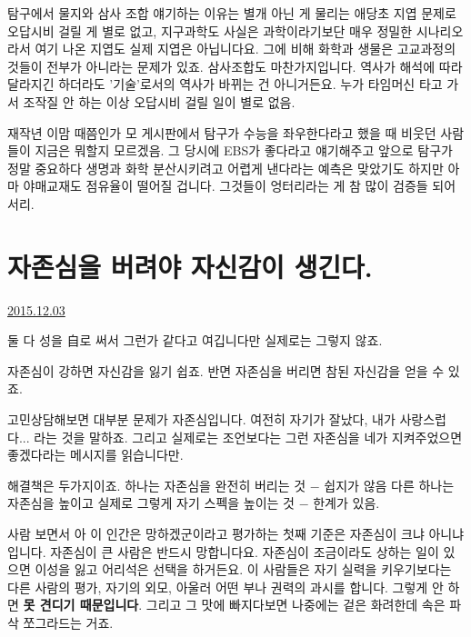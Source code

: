 탐구에서 물지와 삼사 조합 얘기하는 이유는 별개 아닌 게
물리는 애당초 지엽 문제로 오답시비 걸릴 게 별로 없고,
지구과학도 사실은 과학이라기보단 매우 정밀한 시나리오라서 여기 나온 지엽도 실제 지엽은 아닙니다요.
그에 비해 화학과 생물은 고교과정의 것들이 전부가 아니라는 문제가 있죠.
삼사조합도 마찬가지입니다. 역사가 해석에 따라 달라지긴 하더라도 '기술'로서의 역사가 바뀌는 건 아니거든요.
누가 타임머신 타고 가서 조작질 안 하는 이상 오답시비 걸릴 일이 별로 없음.
\vspace{5mm}

재작년 이맘 때쯤인가 모 게시판에서 탐구가 수능을 좌우한다라고 했을 때 비웃던 사람들이 지금은 뭐할지 모르겠음.
그 당시에 EBS가 좋다라고 얘기해주고 앞으로 탐구가 정말 중요하다 생명과 화학 분산시키려고 어렵게 낸다라는 예측은 맞았기도 하지만
아마 야매교재도 점유율이 떨어질 겁니다. 그것들이 엉터리라는 게 참 많이 검증들 되어서리.
\vspace{5mm}







\section{자존심을 버려야 자신감이 생긴다.}
\href{https://www.kockoc.com/Apoc/524793}{2015.12.03}

\vspace{5mm}

둘 다 성을 自로 써서 그런가 같다고 여깁니다만 실제로는 그렇지 않죠.
\vspace{5mm}

자존심이 강하면 자신감을 잃기 쉽죠.
반면 자존심을 버리면 참된 자신감을 얻을 수 있죠.
\vspace{5mm}

고민상담해보면 대부분 문제가 자존심입니다.
여전히 자기가 잘났다, 내가 사랑스럽다... 라는 것을 말하죠.
그리고 실제로는 조언보다는 그런 자존심을 네가 지켜주었으면 좋겠다라는 메시지를 읽습니다만.
\vspace{5mm}

해결책은 두가지이죠.
하나는 자존심을 완전히 버리는 것 $-$ 쉽지가 않음
다른 하나는 자존심을 높이고 실제로 그렇게 자기 스펙을 높이는 것 $-$ 한계가 있음.
\vspace{5mm}

사람 보면서 아 이 인간은 망하겠군이라고 평가하는 첫째 기준은 자존심이 크냐 아니냐 입니다.
자존심이 큰 사람은 반드시 망합니다요. 자존심이 조금이라도 상하는 일이 있으면 이성을 잃고 어리석은 선택을 하거든요.
이 사람들은 자기 실력을 키우기보다는 다른 사람의 평가, 자기의 외모, 아울러 어떤 부나 권력의 과시를 합니다.
그렇게 안 하면 \textbf{못 견디기 때문입니다}. 그리고 그 맛에 빠지다보면 나중에는 겉은 화려한데 속은 파삭 쪼그라드는 거죠.
\vspace{5mm}

